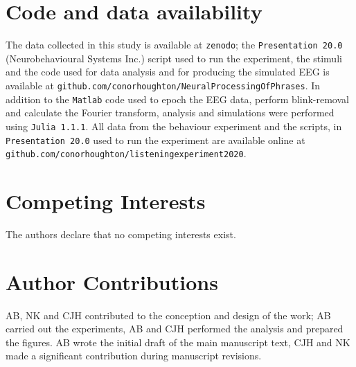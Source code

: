 \documentclass[10pt,letterpaper]{article}
\begin{document}
\section*{Code and data availability}
The data collected in this study is available at \texttt{zenodo}; the
\texttt{Presentation 20.0} (Neurobehavioural Systems Inc.) script used
to run the experiment, the stimuli and the code used for data analysis
and for producing the simulated EEG is available at
\texttt{github.com/conorhoughton/NeuralProcessingOfPhrases}.  In
addition to the \texttt{Matlab} code used to epoch the EEG data,
perform blink-removal and calculate the Fourier transform, analysis
and simulations were performed using \texttt{Julia 1.1.1}. All data
from the behaviour experiment and the scripts, in \texttt{Presentation 20.0}
 used to run the experiment are
available online at \texttt{github.com/conorhoughton/listening\textunderscore{}experiment\textunderscore{}2020}.


\section*{Competing Interests}
The authors declare that no competing interests exist.

{}

\section*{Author Contributions}
AB, NK and CJH contributed to the conception and design of the work;
AB carried out the experiments, AB and CJH performed the analysis and
prepared the figures. AB wrote the initial draft of the main
manuscript text, CJH and NK made a significant contribution during
manuscript revisions.
\end{document}
